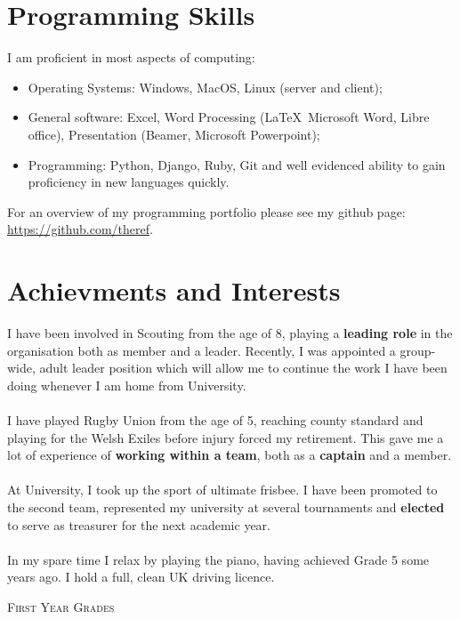 \documentclass[a4paper]{article}
\begin{document}
\section{Programming Skills}
I am proficient in most aspects of computing:

\begin{itemize}
    \item Operating Systems: Windows, MacOS, Linux (server and client);
    \item General software: Excel, Word Processing (\LaTeX\, Microsoft Word, Libre office), Presentation (Beamer, Microsoft Powerpoint);
    \item Programming: Python, Django, Ruby, Git and well evidenced ability to gain proficiency in new languages quickly.
\end{itemize}

For an overview of my programming portfolio please see my github page: \url{https://github.com/theref}.
\section{Achievments and Interests}
I have been involved in Scouting from the age of 8, playing a \textbf{leading role} in the organisation both as member and a leader.
Recently, I was appointed a group-wide, adult leader position which will allow me to continue the work I have been doing whenever I am home from University. \\
\\
I have played Rugby Union from the age of 5, reaching county standard and playing for the Welsh Exiles before injury forced my retirement.
This gave me a lot of experience of \textbf{working within a team}, both as a \textbf{captain} and a member. \\
\\
At University, I took up the sport of ultimate frisbee. I have been promoted to the second team, represented my university at several tournaments and \textbf{elected} to serve as treasurer for the next academic year. \\
\\
In my spare time I relax by playing the piano, having achieved Grade 5 some years ago. I hold a full, clean UK driving licence.
\bigskip
\par{\centering\Large {\textsc{First Year Grades}}
\par}
\end{document}
